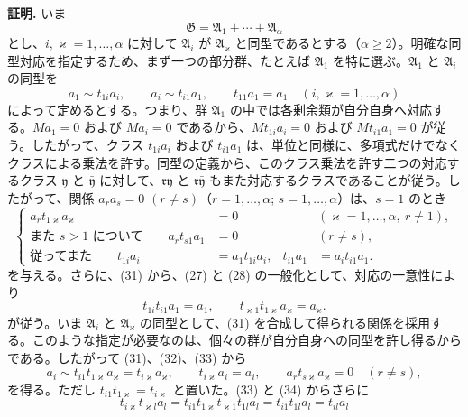 \textbf{証明.} いま
\[
  \mathfrak G=\mathfrak A_1+\cdots+\mathfrak A_\alpha
\]
とし、$i,\varkappa=1,\ldots,\alpha$ に対して $\mathfrak A_i$ が $\mathfrak A_\varkappa$ と同型であるとする（$\alpha\ge2$）。明確な同型対応を指定するため、まず一つの部分群、たとえば $\mathfrak A_1$ を特に選ぶ。$\mathfrak A_1$ と $\mathfrak A_i$ の同型を
\begin{equation}
 a_1\sim t_{1i}a_i,
 \qquad
 a_i\sim t_{i1}a_1,
 \qquad
 t_{11}a_1=a_1
 \quad(i,\varkappa=1,
\ldots,\alpha)
\tag{31}
\end{equation}
によって定めるとする。つまり、群 $\mathfrak A_1$ の中では各剰余類が自分自身へ対応する。$Ma_1=0$ および $Ma_i=0$ であるから、$Mt_{1i}a_i=0$ および $Mt_{i1}a_1=0$ が従う。したがって、クラス $t_{1i}a_i$ および $t_{i1}a_1$ は、単位と同様に、多項式だけでなくクラスによる乗法を許す。同型の定義から、このクラス乗法を許す二つの対応するクラス $\mathfrak y$ と $\bar{\mathfrak y}$ に対して、$\mathfrak r\mathfrak y$ と $\mathfrak r\bar{\mathfrak y}$ もまた対応するクラスであることが従う。したがって、関係 $a_ra_s=0$ $(r\ne s)$（$r=1,\ldots,\alpha$; $s=1,\ldots,\alpha$）は、$s=1$ のとき
\begin{equation}
\left\{
\begin{aligned}
 a_r t_{1\varkappa}a_\varkappa&=0 &&(\varkappa=1,
\ldots,
\alpha,
\ r\ne1),\\
 \text{また }s>1\text{ について}\qquad a_r t_{s1}a_1&=0 &&(r\ne s),\\
 \text{従ってまた}\qquad t_{1i}a_i&=a_1t_{1i}a_i,
 &t_{i1}a_1&=a_it_{i1}a_1.
\end{aligned}\right.
\tag{32}
\end{equation}
を与える。さらに、(31) から、(27) と (28) の一般化として、対応の一意性により
\begin{equation}
 t_{1i}t_{i1}a_1=a_1,
 \qquad
 t_{\varkappa1}t_{1\varkappa}a_\varkappa=a_\varkappa.
\tag{33}
\end{equation}
が従う。いま $\mathfrak A_i$ と $\mathfrak A_\varkappa$ の同型として、(31) を合成して得られる関係を採用する。このような指定が必要なのは、個々の群が自分自身への同型を許し得るからである。したがって (31)、(32)、(33) から
\begin{equation}
 a_i\sim t_{i1}t_{1\varkappa}a_\varkappa=t_{i\varkappa}a_\varkappa,
 \qquad
 t_{i\varkappa}a_i=a_i,
 \qquad
 a_rt_{s\varkappa}a_\varkappa=0\quad(r\ne s),
\tag{34}
\end{equation}
を得る。ただし $t_{i1}t_{1\varkappa}=t_{i\varkappa}$ と置いた。(33) と (34) からさらに
\[
 t_{i\varkappa}t_{\varkappa l}a_l=t_{i1}t_{1\varkappa}t_{\varkappa1}t_{1l}a_l
 =t_{i1}t_{1l}a_l=t_{il}a_l
\]
